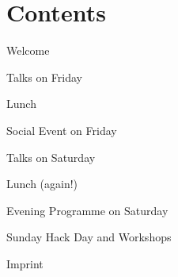 \section*{Contents}

\noindent Welcome \dotfill \pageref{welcome}

\vspace*{0.35em}%
\noindent Talks on Friday \dotfill \pageref{friday}

\vspace*{0.35em}%
\noindent Lunch \dotfill \pageref{lunch}

\vspace*{0.35em}%
\noindent Social Event on Friday \dotfill \pageref{social-event}

\vspace*{0.35em}%
\noindent Talks on Saturday \dotfill \pageref{saturday}

\vspace*{0.35em}%
\noindent Lunch (again!)\dotfill \pageref{lunch}

\vspace*{0.35em}%
\noindent Evening Programme on Saturday\dotfill \pageref{kuehler-krug}

\vspace*{0.35em}%
\noindent Sunday Hack Day and Workshops \dotfill \pageref{sunday}

\vspace*{0.35em}%
\noindent Imprint \dotfill \pageref{imprint}\\
